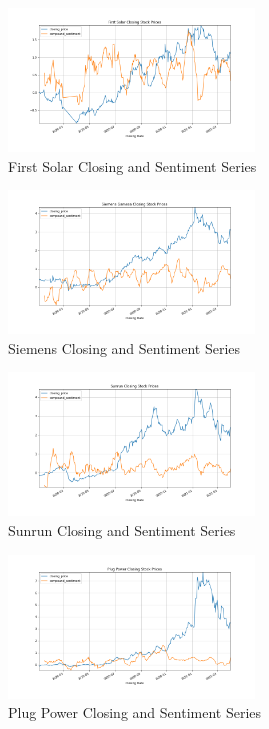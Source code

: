 \documentclass[sigconf, nonacm]{acmart}
\begin{document}
\begin{figure}[H]
  \centering
  \includegraphics[width=\linewidth, height =1.5in]{sentiment_time_series/First Solar Closing Stock Prices_closing_price_compound_sentiment.png}
  \caption{First Solar Closing and Sentiment Series}
\end{figure}

\begin{figure}[H]
  \centering
  \includegraphics[width=\linewidth, height =1.5in]{sentiment_time_series/Siemens Gamesa Closing Stock Prices_closing_price_compound_sentiment.png}
  \caption{Siemens Closing and Sentiment Series}
\end{figure}

\begin{figure}[H]
  \centering
  \includegraphics[width=\linewidth, height =1.5in]{sentiment_time_series/Sunrun Closing Stock Prices_closing_price_compound_sentiment.png}
  \caption{Sunrun Closing and Sentiment Series}
\end{figure}

\begin{figure}[H]
  \centering
  \includegraphics[width=\linewidth, height =1.5in]{sentiment_time_series/Plug Power Closing Stock Prices_closing_price_compound_sentiment.png}
  \caption{Plug Power Closing and Sentiment Series}
\end{figure}
\end{document}
